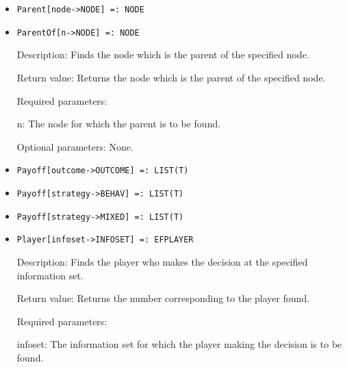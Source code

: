 \begin{itemize}
\item
\protect \large \begin{verbatim}
Parent[node->NODE] =: NODE
\end{verbatim}\normalsize

\item
\protect \large \begin{verbatim}
ParentOf[n->NODE] =: NODE
\end{verbatim}\normalsize

\bd
\item
[Description:] Finds the node which is the parent of the specified
node.
\item
[Return value:] Returns the node which is the parent of the specified
node.
\item
[Required parameters:]\hfil\null
	
\bd
\item
[n:] The node for which the parent is to be found.
\ed

\item
[Optional parameters:] None.
\ed

\item
\protect \large \begin{verbatim}
Payoff[outcome->OUTCOME] =: LIST(T)
\end{verbatim}\normalsize

\item
\protect \large \begin{verbatim}
Payoff[strategy->BEHAV] =: LIST(T)
\end{verbatim}\normalsize

\item
\protect \large \begin{verbatim}
Payoff[strategy->MIXED] =: LIST(T)
\end{verbatim}\normalsize

\item
\protect \large \begin{verbatim}
Player[infoset->INFOSET] =: EFPLAYER
\end{verbatim}\normalsize

\bd
\item
[Description:] Finds the player who makes the decision at the
specified information set.
\item
[Return value:] Returns the number corresponding to the player found.
\item
[Required parameters:]\hfil\null

\bd
\item
[infoset:] The information set for which the player making the
decision is to be found.
\ed


\end{itemize}
